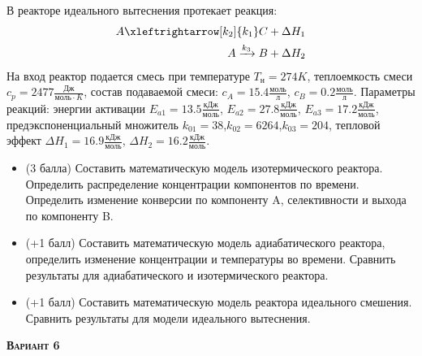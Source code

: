  В реакторе идеального вытеснения протекает реакция: \begin{equation*} \begin{aligned} A \xleftrightarrow[k_2]{k_1} C + \Delta H_1 \\ A \xrightarrow{k_3} B + \Delta H_2 \end{aligned} \end{equation*}                                      На вход  реактор подается смесь при температуре $ T_н =  274 K$, теплоемкость смеси $c_p= 2477 \frac{Дж}{моль \cdot K}$, состав подаваемой смеси: $c_A=15.4 \frac{моль}{л}$, $c_B=0.2 \frac{моль}{л}$. Параметры реакций: энергии активации $E_{a1}=13.5 \frac{кДж}{моль}$, $E_{a2}=27.8  \frac{кДж}{моль}$, $E_{a3}=17.2  \frac{кДж}{моль}$, предэкспоненциальный множитель $k_{01}=        38$,$k_{02}=      6264$,$k_{03}=       204$, тепловой эффект $\Delta H_1= 16.9  \frac{кДж}{моль}$, $\Delta H_2=16.2 \frac{кДж}{моль}$.\begin{itemize} \item (3 балла) Составить математическую модель изотермического реактора. Определить распределение концентрации компонентов по времени. Определить изменение конверсии по компоненту A, селективности и выхода по компоненту B. \item (+1 балл) Составить математическую модель адиабатического реактора, определить изменение концентрации и температуры во времени. Сравнить результаты для адиабатического и изотермического реактора. \item (+1 балл) Составить математическую модель реактора идеального смешения. Сравнить результаты для модели идеального вытеснения. \end{itemize}

\textsc{\textbf{Вариант 6}}


